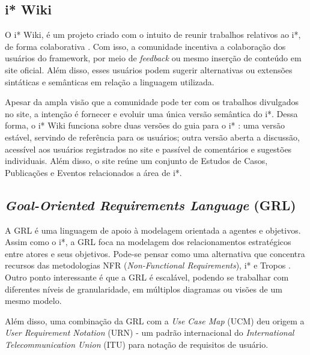         \subsection{i* Wiki}
                O i* Wiki, é um projeto criado com o intuito de reunir trabalhos relativos ao i*, de forma colaborativa
                    \cite{site2013iwiki} \cite{leuf2001wiki}.
                Com isso, a comunidade incentiva a colaboração dos usuários do framework, por meio de \emph{feedback} ou mesmo inserção de conteúdo em site oficial.
                Além disso, esses usuários podem sugerir alternativas ou extensões sintáticas e semânticas em relação a linguagem utilizada.
            
                Apesar da ampla visão que a comunidade pode ter com os trabalhos divulgados no site, a intenção é fornecer e evoluir uma única versão semântica do i*.
                Dessa forma, o i* Wiki funciona sobre duas versões do guia para o i* \cite{site2013iwiki}:
                    uma versão estável, servindo de referência para os usuários;
                    outra versão aberta a discussão, acessível aos usuários registrados no site e passível de comentários e sugestões individuais.
                Além disso, o site reúne um conjunto de Estudos de Casos, Publicações e Eventos relacionados a área de i*.

        \subsection{\emph{Goal-Oriented Requirements Language} (GRL)}
            A GRL é uma linguagem de apoio à modelagem orientada a agentes e objetivos.
            Assim como o i*, a GRL foca na modelagem dos relacionamentos estratégicos entre atores e seus objetivos.
            Pode-se pensar como uma alternativa que concentra recursos das metodologias NFR (\emph{Non-Functional Requirements}), i* e Tropos \cite{regev2005goals}.
            Outro ponto interessante é que a GRL é escalável, podendo se trabalhar com diferentes níveis de granularidade, em múltiplos diagramas ou visões de um mesmo modelo.

            Além disso, uma combinação da GRL com a \emph{Use Case Map} (UCM) deu origem a \emph{User Requirement Notation} (URN) - um padrão internacional do \emph{International  Telecommunication  Union} (ITU) para notação de requisitos de usuário.

